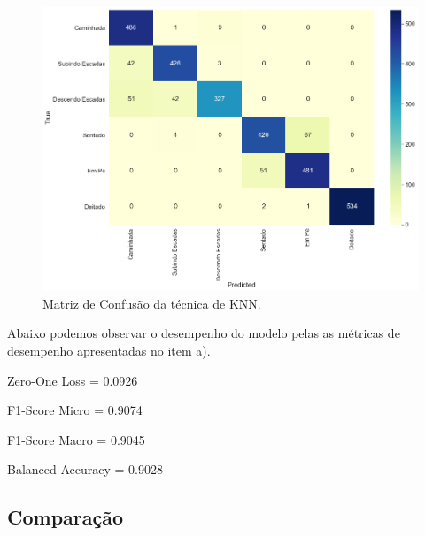 \documentclass[12pt]{article}
\begin{document}
\begin{figure}[H]
	\centering
	\includegraphics[width=.7\linewidth]{images/conf_m_2_k.png}
	\caption{Matriz de Confusão da técnica de KNN.}
	\label{fig:conf_m_2_k}
\end{figure}

Abaixo podemos observar o desempenho do modelo pelas as métricas de desempenho apresentadas no item a).

\begin{center}
	Zero-One Loss = 0.0926
	
	F1-Score Micro = 0.9074
	
	F1-Score Macro = 0.9045
	
	Balanced Accuracy = 0.9028
\end{center}

\subsection*{Comparação}
\end{document}
